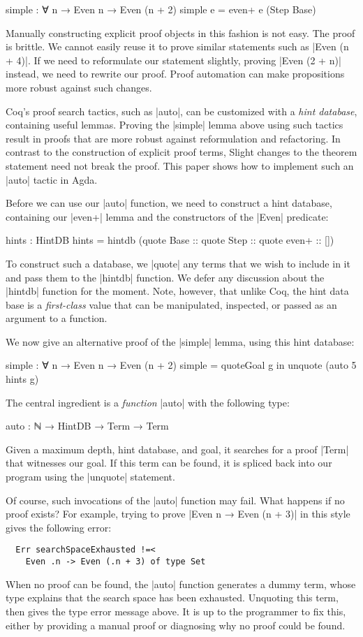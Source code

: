 \documentclass[preprint]{sigplanconf}
\begin{document}
\begin{code}
  simple : ∀ {n} → Even n → Even (n + 2)
  simple e = even+ e (Step Base)
\end{code}
Manually constructing explicit proof objects
in this fashion is not easy. The proof is brittle. We cannot easily
reuse it to prove similar statements such as |Even (n + 4)|. If we
need to reformulate our statement slightly, proving |Even (2 + n)|
instead, we need to rewrite our proof. Proof automation can make
propositions more robust against such changes.

Coq's proof search tactics, such as |auto|, can be customized with a
\emph{hint database}, containing useful lemmas. Proving the |simple|
lemma above using such tactics result in proofs that are more robust
against reformulation and refactoring. In contrast to the construction
of explicit proof terms, Slight changes to the theorem statement need
not break the proof. This paper shows how to implement such an |auto|
tactic in Agda.

Before we can use our |auto| function, we need to construct a hint
database, containing our |even+| lemma and the constructors of the
|Even| predicate:
\begin{code}
  hints : HintDB
  hints = hintdb
    (quote Base :: quote Step :: quote even+ :: [])
\end{code}
To construct such a database, we |quote| any terms that we wish to
include in it and pass them to the |hintdb| function.  We
defer any discussion about the |hintdb| function for the moment. Note,
however, that unlike Coq, the hint data base is a \emph{first-class}
value that can be manipulated, inspected, or passed as an argument to
a function.

We now give an alternative proof of the |simple| lemma, using this
hint database:
\begin{code}
  simple : ∀ {n} → Even n → Even (n + 2)
  simple = quoteGoal g in unquote (auto 5 hints g)
\end{code}
The central ingredient is a \emph{function} |auto| with the following
type:
\begin{code}
  auto : ℕ → HintDB → Term → Term
\end{code}
Given a maximum depth, hint database, and goal, it searches for a
proof |Term| that witnesses our goal. If this term can be found, it is
spliced back into our program using the |unquote| statement.

Of course, such invocations of the |auto| function may fail. What
happens if no proof exists? For example, trying to prove |Even n →
Even (n + 3)| in this style gives the following error:
\begin{verbatim}
  Err searchSpaceExhausted !=<
    Even .n -> Even (.n + 3) of type Set
\end{verbatim}
When no proof can be found, the |auto| function generates a dummy
term, whose type explains that the search space has been
exhausted. Unquoting this term, then gives the type error message
above. It is up to the programmer to fix this, either by providing a
manual proof or diagnosing why no proof could be found.
\end{document}
